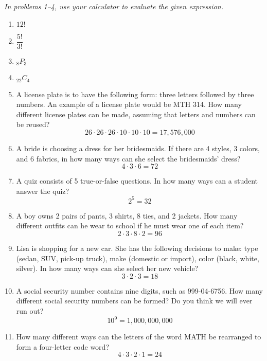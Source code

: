 \emph{In problems 1--4, use your calculator to evaluate the given expression.}
\begin{enumerate}
\item $12!$ 

\item $\dfrac{5!}{3!}$ 

\item $_8P_3$ 

\item $_{22}C_4$ 

\item A license plate is to have the following form: three letters followed by three
numbers. An example of a license plate would be MTH 314. How many different license plates can be made, assuming that letters and numbers can be reused? 
\[26 \cdot 26 \cdot 26 \cdot 10 \cdot 10 \cdot 10 = 17,576,000\]

\item A bride is choosing a dress for her bridesmaids. If there are 4 styles, 3 colors, and 6 fabrics, in how many ways can she select the bridesmaids' dress? 
\[4 \cdot 3 \cdot 6 = 72\]

\item A quiz consists of 5 true-or-false questions. In how many ways can a student answer the quiz? 
\[2^5 = 32\]

\item A boy owns 2 pairs of pants, 3 shirts, 8 ties, and 2 jackets. How many different outfits can he wear to school if he must wear one of each item? 
\[2 \cdot 3 \cdot 8 \cdot 2 = 96\]

\item Lisa is shopping for a new car. She has the following decisions to make: type (sedan, SUV, pick-up truck), make (domestic or import), color (black, white, silver). In how many ways can she select her new vehicle? 
\[3 \cdot 2 \cdot 3 = 18\]

\item A social security number contains nine digits, such as 999-04-6756. How many different social security numbers can be formed? Do you think we will ever run out? 
\[10^9 = 1,000,000,000\]

\item How many different ways can the letters of the word MATH be rearranged to form a four-letter code word? 
\[4 \cdot 3 \cdot 2 \cdot 1 = 24\]


\end{enumerate}

